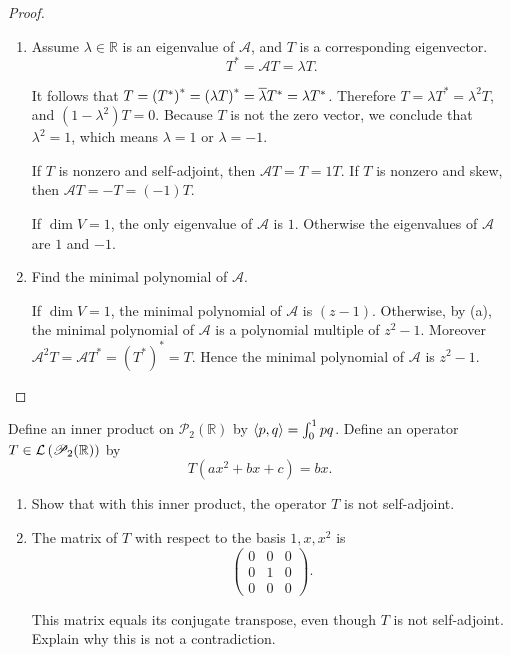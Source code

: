 \begin{proof}
    \begin{enumerate}[label={(\alph*)}]
        \item Assume $\lambda\in\mathbb{R}$ is an eigenvalue of $\mathcal{A}$, and $T$ is a corresponding eigenvector.
        \[
            T^{*} = \mathcal{A}T = \lambda T.
        \]

        It follows that $T = {(T^{*})}^{*} = {(\lambda T)}^{*} = \overline{\lambda}T^{*} = \lambda T^{*}$. Therefore $T = \lambda T^{*} = \lambda^{2}T$, and $(1 - \lambda^{2})T = 0$. Because $T$ is not the zero vector, we conclude that $\lambda^{2} = 1$, which means $\lambda = 1$ or $\lambda = -1$.

        If $T$ is nonzero and self-adjoint, then $\mathcal{A}T = T = 1T$. If $T$ is nonzero and skew, then $\mathcal{A}T = -T = (-1)T$.

        If $\dim V = 1$, the only eigenvalue of $\mathcal{A}$ is $1$. Otherwise the eigenvalues of $\mathcal{A}$ are $1$ and $-1$.
        \item Find the minimal polynomial of $\mathcal{A}$.

        If $\dim V = 1$, the minimal polynomial of $\mathcal{A}$ is $(z - 1)$. Otherwise, by (a), the minimal polynomial of $\mathcal{A}$ is a polynomial multiple of $z^{2} - 1$. Moreover $\mathcal{A}^{2}T = \mathcal{A}T^{*} = {(T^{*})}^{*} = T$. Hence the minimal polynomial of $\mathcal{A}$ is $z^{2} - 1$.
    \end{enumerate}
\end{proof}
\newpage

\begin{exercise}
    Define an inner product on $\mathscr{P}_{2}(\mathbb{R})$ by $\left\langle{p, q}\right\rangle = \int^{1}_{0}pq$. Define an operator $T\in\mathcal{L}\left({\mathscr{P}_{2}(\mathbb{R})}\right)$ by
    \[
        T(ax^{2} + bx + c) = bx.
    \]

    \begin{enumerate}[label={(\alph*)}]
        \item Show that with this inner product, the operator $T$ is not self-adjoint.
        \item The matrix of $T$ with respect to the basis $1, x, x^{2}$ is
        \[
            \begin{pmatrix}
                0 & 0 & 0 \\
                0 & 1 & 0 \\
                0 & 0 & 0
            \end{pmatrix}.
        \]

        This matrix equals its conjugate transpose, even though $T$ is not self-adjoint. Explain why this is not a contradiction.
    \end{enumerate}
\end{exercise}

